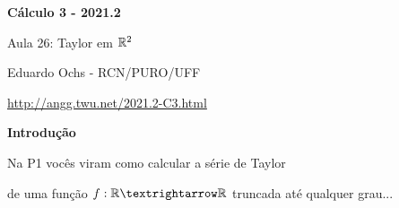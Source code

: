 \documentclass[oneside,12pt]{article}
\begin{document}
%



\def\u#1{\par{\footnotesize \url{#1}}}

\def\drafturl{http://angg.twu.net/LATEX/2021-2-C3.pdf}
\def\drafturl{http://angg.twu.net/2021.2-C3.html}
\def\draftfooter{\tiny \href{\drafturl}{\jobname{}} \ColorBrown{\shorttoday{} \hours}}



%

\thispagestyle{empty}

\begin{center}

\vspace*{1.2cm}

{\bf \Large Cálculo 3 - 2021.2}

\bsk

Aula 26: Taylor em $\mathbb{R}^2$

\bsk

Eduardo Ochs - RCN/PURO/UFF

\url{http://angg.twu.net/2021.2-C3.html}

\end{center}

\newpage


{\bf Introdução}

Na P1 vocês viram como calcular a série de Taylor

de uma função $f:\R→\R$ truncada até qualquer grau...
\end{document}
